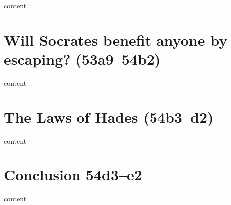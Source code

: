 \documentclass[11pt]{article}
\begin{document}
content

\section{Will Socrates benefit anyone by escaping? (53a9--54b2)}

content

\section{The Laws of Hades (54b3--d2)}

content

\section{Conclusion 54d3--e2}

content

\newpage


\end{document}
